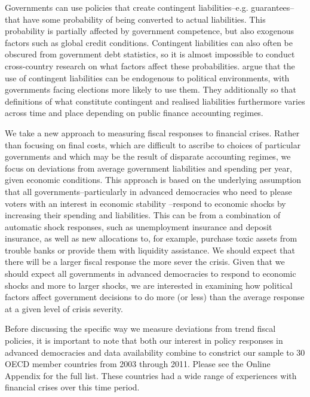 \documentclass[]{article}
\begin{document}
Governments can use policies that create contingent liabilities--e.g. guarantees--that have some probability of being converted to actual liabilities. This probability is partially affected by government competence, but also exogenous factors such as global credit conditions. Contingent liabilities can also often be obscured from government debt statistics, so it is almost impossible to conduct cross-country research on what factors affect these probabilities. \cite{gandrudHallerbergWEP} argue that the use of contingent liabilities can be endogenous to political environments, with governments facing elections more likely to use them. They additionally so that definitions of what constitute contingent and realised liabilities furthermore varies across time and place depending on public finance accounting regimes.

We take a new approach to measuring fiscal responses to financial crises. Rather than focusing on final costs, which are difficult to ascribe to choices of particular governments and which may be the result of disparate accounting regimes, we focus on deviations from average government liabilities and spending per year, given economic conditions. This approach is based on the underlying assumption that all governments--particularly in advanced democracies who need to please voters with an interest in economic stability \cite{Rosas2009}--respond to economic shocks by increasing their spending and liabilities. This can be from a combination of automatic shock responses, such as unemployment insurance and deposit insurance, as well as new allocations to, for example, purchase toxic assets from trouble banks or provide them with liquidity assistance. We should expect that there will be a larger fiscal response the more sever the crisis. Given that we should expect all governments in advanced democracies to respond to economic shocks and more to larger shocks, we are interested in examining how political factors affect government decisions to do more (or less) than the average response at a given level of crisis severity.

Before discussing the specific way we measure deviations from trend fiscal policies, it is important to note that both our interest in policy responses in advanced democracies and data availability combine to constrict our sample to 30 OECD member countries from 2003 through 2011. Please see the Online Appendix for the full list. These countries had a wide range of experiences with financial crises over this time period.
\end{document}
